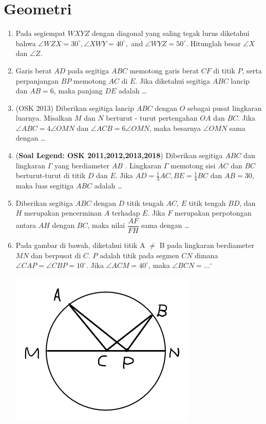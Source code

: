 \documentclass[11pt]{scrartcl}
\begin{document}
\section{Geometri}
\begin{enumerate}
    \item Pada segiempat $WXYZ$ dengan diagonal yang saling tegak lurus diketahui bahwa $\angle WZX = 30^\circ, \angle XWY = 40^\circ,$ and $\angle WYZ = 50^\circ$. Hitunglah besar $\angle X$ dan $\angle Z$.
    
    \item
		Garis berat $AD$ pada segitiga $ABC$ memotong garis berat $CF$ di titik $P$, serta perpanjangan $BP$ memotong $AC$ di $E$. Jika diketahui segitiga $ABC$ lancip dan $AB=6$, maka panjang $DE$ adalah \dots
		
	\item (OSK 2013) Diberikan segitiga lancip $ABC$ dengan $O$ sebagai pusat lingkaran luarnya. Misalkan $M$ dan $N$
berturut - turut pertengahan $OA$ dan $BC$. Jika $\angle ABC = 4\angle OMN$ dan $\angle ACB = 6\angle OMN$,
maka besarnya $\angle OMN$ sama dengan \dots

    \item (\textbf{Soal Legend: OSK 2011,2012,2013,2018}) Diberikan segitiga $ABC$ dan lingkaran $\Gamma$ yang berdiameter $AB$ . Lingkaran $\Gamma$ memotong sisi $AC$ dan $BC$
berturut-turut di titik $D$ dan $E$. Jika $AD = \frac13 AC, BE =\frac14 BC$ dan $AB = 30$, maka luas segitiga $ABC$ adalah \dots
		
	\item
		Diberikan segitiga $ABC$ dengan $D$ titik tengah $AC$, $E$ titik tengah $BD$, dan $H$ merupakan pencerminan $A$ terhadap $E$. Jika $F$ merupakan perpotongan antara $AH$ dengan $BC$, maka nilai $\dfrac{AF}{FH}$ sama dengan \dots
		
	\item 	
		 Pada gambar di bawah, diketahui titik A $\ne$ B pada lingkaran berdiameter $MN$ dan berpusat di $C$. $P$ adalah titik pada segmen $CN$ dimana $\angle CAP = \angle CBP = 10 ^\circ$. Jika $\angle ACM = 40^\circ$, maka $\angle BCN = \dots^\circ$
		 
		 \includegraphics[scale=0.7]{pemanasan post test geom}
		 

\end{enumerate}
\end{document}
